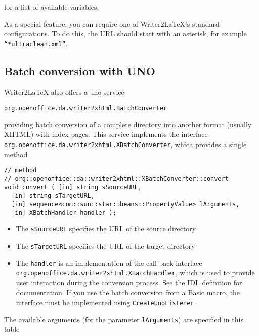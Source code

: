\documentclass{article}
\newcommand\textstyleSourceText[1]{\texttt{\textmd{#1}}}
\newcommand\liststyleLxvi{%
\renewcommand\labelitemi{${\bullet}$}
\renewcommand\labelitemii{${\circ}$}
\renewcommand\labelitemiii{${\blacksquare}$}
\renewcommand\labelitemiv{${\bullet}$}
}
\begin{document}
{\mdseries
for a list of available variables.}

{\mdseries
As a special feature, you can require one of Writer2LaTeX's standard configurations. To do this, the URL should start with an asterisk, for example \textstyleSourceText{``*ultraclean.xml''}.}

\subsection[Batch conversion with UNO]{Batch conversion with UNO}
{\mdseries
Writer2LaTeX also offers a uno service}

{\centering
\textstyleSourceText{org.openoffice.da.writer2xhtml.BatchConverter}
\par}

{\mdseries
providing batch conversion of a complete directory into another format (usually XHTML) with index pages. This service implements the interface \textstyleSourceText{org.openoffice.da.writer2xhtml.XBatchConverter}, which provides a single method}

\begin{verbatim}
// method
// org::openoffice::da::writer2xhtml::XBatchConverter::convert
void convert ( [in] string sSourceURL,
  [in] string sTargetURL,
  [in] sequence<com::sun::star::beans::PropertyValue> lArguments, 
  [in] XBatchHandler handler );
\end{verbatim}
\liststyleLxvi
\begin{itemize}
\item The \textstyleSourceText{sSourceURL} specifies the URL of the source directory
\item The \textstyleSourceText{sTargetURL} specifies the URL of the target directory
\item The \textstyleSourceText{handler} is an implementation of the call back interface \textstyleSourceText{org.openoffice.da.writer2xhtml.XBatchHandler}, which is used to provide user interaction during the conversion process. See the IDL definition for documentation. If you use the batch conversion from a Basic macro, the interface must be implemented using \textstyleSourceText{CreateUnoListener}.
\end{itemize}
{\mdseries
The available arguments (for the parameter \textstyleSourceText{lArguments}) are specified in this table}
\end{document}
